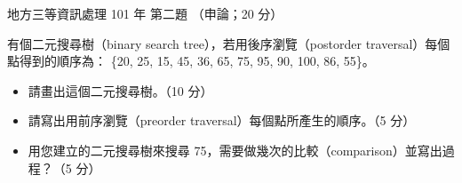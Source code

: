 \begin{pastexam}[label={px:df3-101-ds-02}]{地方三等資訊處理 101 年 第二題}
（申論；20 分）

有個二元搜尋樹（binary search tree），若用後序瀏覽（postorder traversal）每個點得到的順序為：
\{20, 25, 15, 45, 36, 65, 75, 95, 90, 100, 86, 55\}。
\begin{itemize}[leftmargin=2.2em]
\item[㈠] 請畫出這個二元搜尋樹。（10 分）
\item[㈡] 請寫出用前序瀏覽（preorder traversal）每個點所產生的順序。（5 分）
\item[㈢] 用您建立的二元搜尋樹來搜尋 75，需要做幾次的比較（comparison）並寫出過程？（5 分）
\end{itemize}
\end{pastexam}

